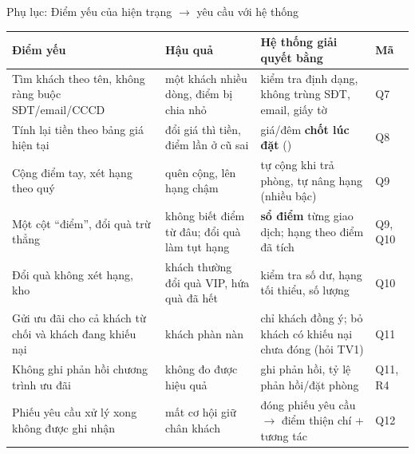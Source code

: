 
\begin{frame}{Phụ lục: Điểm yếu của hiện trạng $\to$ yêu cầu với hệ thống \TB}
\scriptsize
\begin{tabularx}{\textwidth}{@{}YYL{4.3cm}L{1.1cm}@{}}
\toprule
\textbf{Điểm yếu} & \textbf{Hậu quả} & \textbf{Hệ thống giải quyết bằng} & \textbf{Mã} \\
\midrule
Tìm khách theo tên, không ràng buộc SĐT/email/CCCD & một khách nhiều dòng, điểm bị chia nhỏ & kiểm tra định dạng, không trùng SĐT, email, giấy tờ & Q7 \\
Tính lại tiền theo bảng giá hiện tại & đổi giá thì tiền, điểm lần ở cũ sai & giá/đêm \textbf{chốt lúc đặt} () & Q8 \\
Cộng điểm tay, xét hạng theo quý & quên cộng, lên hạng chậm & tự cộng khi trả phòng, tự nâng hạng (nhiều bậc) & Q9 \\
Một cột ``điểm'', đổi quà trừ thẳng & không biết điểm từ đâu; đổi quà làm tụt hạng & \textbf{sổ điểm} từng giao dịch; hạng theo điểm đã tích & Q9, Q10 \\
Đổi quà không xét hạng, kho & khách thường đổi quà VIP, hứa quà đã hết & kiểm tra số dư, hạng tối thiểu, số lượng & Q10 \\
Gửi ưu đãi cho cả khách từ chối và khách đang khiếu nại & khách phàn nàn & chỉ khách đồng ý; bỏ khách có khiếu nại chưa đóng (hỏi TV1) & Q11 \\
Không ghi phản hồi chương trình ưu đãi & không đo được hiệu quả & ghi phản hồi, tỷ lệ phản hồi/đặt phòng & Q11, R4 \\
Phiếu yêu cầu xử lý xong không được ghi nhận & mất cơ hội giữ chân khách & đóng phiếu yêu cầu $\to$ điểm thiện chí + tương tác & Q12 \\
\bottomrule
\end{tabularx}
\end{frame}

